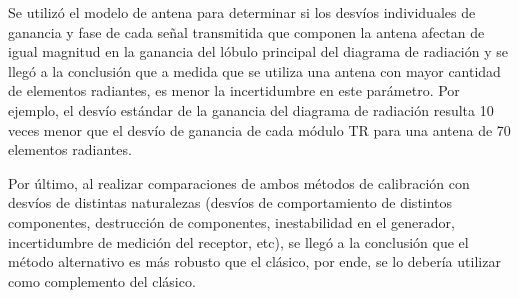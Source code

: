 Se utilizó el modelo de antena para determinar si los desvíos individuales de ganancia y fase de cada señal transmitida que 
componen la antena afectan de igual magnitud en la ganancia del lóbulo principal del diagrama de radiación y se llegó a la 
conclusión que a medida que se utiliza una antena con mayor cantidad de elementos radiantes, es menor la incertidumbre en este 
parámetro. Por ejemplo, el desvío estándar de la ganancia del diagrama de radiación resulta 10 veces menor que el desvío de 
ganancia de cada módulo TR para una antena de 70 elementos radiantes.

Por último, al realizar comparaciones de ambos métodos de calibración con desvíos de distintas naturalezas (desvíos de 
comportamiento de distintos componentes, destrucción de componentes, inestabilidad en el generador, incertidumbre de medición 
del receptor, etc), se llegó a la conclusión que el método alternativo es más robusto que el clásico, por ende, se lo 
debería utilizar como complemento del clásico.

